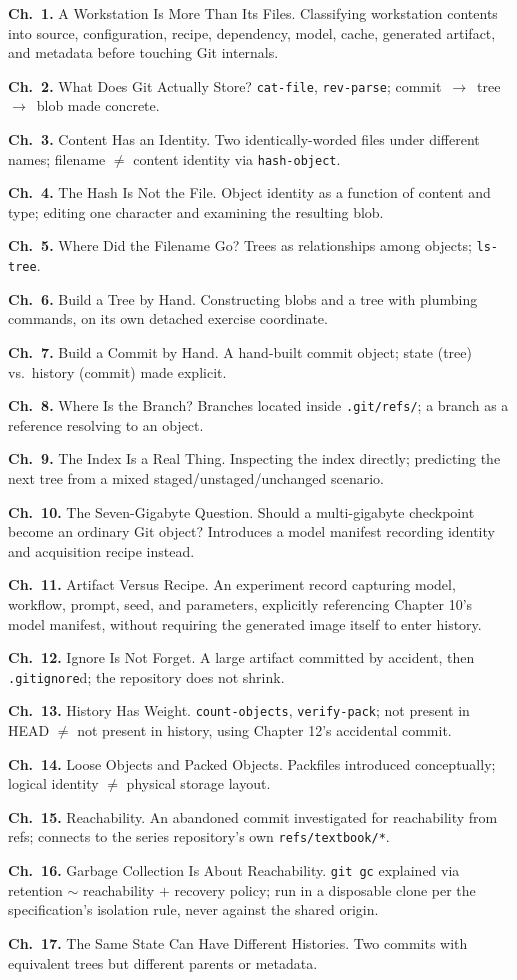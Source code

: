 \documentclass[11pt]{book}
\newcommand{\subheading}[1]{\bigskip\noindent{\bfseries\itshape #1}\smallskip\par}
\newcommand{\chapentry}[2]{\noindent\textbf{Ch.~#1.} #2\par\smallskip}
\begin{document}
\subheading{Chapter Outline}
\chapentry{1}{A Workstation Is More Than Its Files. Classifying workstation contents into source, configuration, recipe, dependency, model, cache, generated artifact, and metadata before touching Git internals.}
\chapentry{2}{What Does Git Actually Store? \texttt{cat-file}, \texttt{rev-parse}; commit~$\to$~tree~$\to$~blob made concrete.}
\chapentry{3}{Content Has an Identity. Two identically-worded files under different names; filename $\neq$ content identity via \texttt{hash-object}.}
\chapentry{4}{The Hash Is Not the File. Object identity as a function of content and type; editing one character and examining the resulting blob.}
\chapentry{5}{Where Did the Filename Go? Trees as relationships among objects; \texttt{ls-tree}.}
\chapentry{6}{Build a Tree by Hand. Constructing blobs and a tree with plumbing commands, on its own detached exercise coordinate.}
\chapentry{7}{Build a Commit by Hand. A hand-built commit object; state (tree) vs.\ history (commit) made explicit.}
\chapentry{8}{Where Is the Branch? Branches located inside \texttt{.git/refs/}; a branch as a reference resolving to an object.}
\chapentry{9}{The Index Is a Real Thing. Inspecting the index directly; predicting the next tree from a mixed staged/unstaged/unchanged scenario.}
\chapentry{10}{The Seven-Gigabyte Question. Should a multi-gigabyte checkpoint become an ordinary Git object? Introduces a model manifest recording identity and acquisition recipe instead.}
\chapentry{11}{Artifact Versus Recipe. An experiment record capturing model, workflow, prompt, seed, and parameters, explicitly referencing Chapter 10's model manifest, without requiring the generated image itself to enter history.}
\chapentry{12}{Ignore Is Not Forget. A large artifact committed by accident, then \texttt{.gitignore}d; the repository does not shrink.}
\chapentry{13}{History Has Weight. \texttt{count-objects}, \texttt{verify-pack}; not present in HEAD $\neq$ not present in history, using Chapter 12's accidental commit.}
\chapentry{14}{Loose Objects and Packed Objects. Packfiles introduced conceptually; logical identity $\neq$ physical storage layout.}
\chapentry{15}{Reachability. An abandoned commit investigated for reachability from refs; connects to the series repository's own \texttt{refs/textbook/*}.}
\chapentry{16}{Garbage Collection Is About Reachability. \texttt{git gc} explained via retention $\sim$ reachability $+$ recovery policy; run in a disposable clone per the specification's isolation rule, never against the shared origin.}
\chapentry{17}{The Same State Can Have Different Histories. Two commits with equivalent trees but different parents or metadata.}
\end{document}
